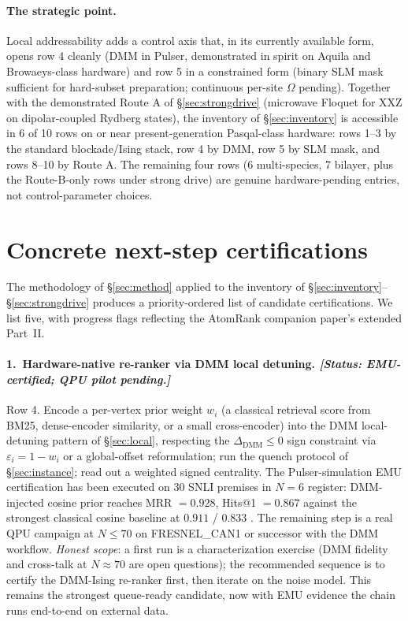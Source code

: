 \documentclass[10pt]{article}
\begin{document}
\paragraph{The strategic point.}
Local addressability adds a control axis that, in its currently available form, opens row 4 cleanly (DMM in Pulser, demonstrated in spirit on Aquila and Browaeys-class hardware) and row 5 in a constrained form (binary SLM mask sufficient for hard-subset preparation; continuous per-site $\Omega$ pending). Together with the demonstrated Route A of \S\ref{sec:strongdrive} (microwave Floquet for XXZ on dipolar-coupled Rydberg states), the inventory of \S\ref{sec:inventory} is accessible in 6 of 10 rows on or near present-generation Pasqal-class hardware: rows 1--3 by the standard blockade/Ising stack, row 4 by DMM, row 5 by SLM mask, and rows 8--10 by Route A. The remaining four rows (6 multi-species, 7 bilayer, plus the Route-B-only rows under strong drive) are genuine hardware-pending entries, not control-parameter choices.

\section{Concrete next-step certifications}\label{sec:next}

The methodology of \S\ref{sec:method} applied to the inventory of \S\ref{sec:inventory}--\S\ref{sec:strongdrive} produces a priority-ordered list of candidate certifications. We list five, with progress flags reflecting the AtomRank companion paper's \cite{jurczak2026atomrank} extended Part~II.

\paragraph{1.\ Hardware-native re-ranker via DMM local detuning. \emph{[Status: EMU-certified; QPU pilot pending.]}}
Row 4. Encode a per-vertex prior weight $w_i$ (a classical retrieval score from BM25, dense-encoder similarity, or a small cross-encoder) into the DMM local-detuning pattern of \S\ref{sec:local}, respecting the $\Delta_\text{DMM} \leq 0$ sign constraint via $\varepsilon_i = 1 - w_i$ or a global-offset reformulation; run the quench protocol of \S\ref{sec:instance}; read out a weighted signed centrality. The Pulser-simulation EMU certification has been executed on 30 SNLI premises in $N = 6$ register: DMM-injected cosine prior reaches MRR $= 0.928$, Hits@1 $= 0.867$ against the strongest classical cosine baseline at $0.911$ / $0.833$ \cite{jurczak2026atomrank}. The remaining step is a real QPU campaign at $N \leq 70$ on FRESNEL\_CAN1 or successor with the DMM workflow. \emph{Honest scope}: a first run is a characterization exercise (DMM fidelity and cross-talk at $N \approx 70$ are open questions); the recommended sequence is to certify the DMM-Ising re-ranker first, then iterate on the noise model. This remains the strongest queue-ready candidate, now with EMU evidence the chain runs end-to-end on external data.
\end{document}
